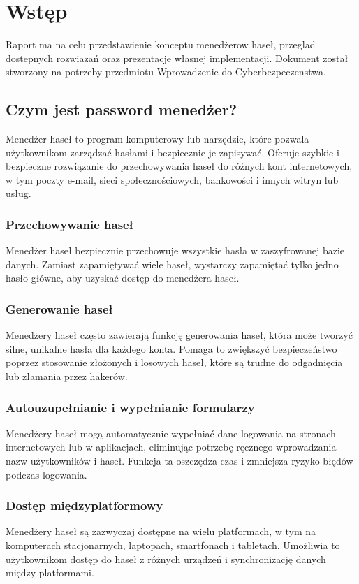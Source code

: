 \section{Wstęp}
Raport ma na celu przedstawienie konceptu menedżerow haseł, przeglad dostepnych rozwiazań oraz prezentacje własnej implementacji. Dokument został stworzony na potrzeby przedmiotu Wprowadzenie do Cyberbezpeczenstwa. 

\subsection{Czym jest password menedżer?}
Menedżer haseł to program komputerowy lub narzędzie, które pozwala użytkownikom zarządzać hasłami i bezpiecznie je zapisywać. Oferuje szybkie i bezpieczne rozwiązanie do przechowywania haseł do różnych kont internetowych, w tym poczty e-mail, sieci społecznościowych, bankowości i innych witryn lub usług.
\subsubsection{Przechowywanie haseł}
Menedżer haseł bezpiecznie przechowuje wszystkie hasła w zaszyfrowanej bazie danych. Zamiast zapamiętywać wiele haseł, wystarczy zapamiętać tylko jedno hasło główne, aby uzyskać dostęp do menedżera haseł.
\subsubsection{Generowanie haseł}
Menedżery haseł często zawierają funkcję generowania haseł, która może tworzyć silne, unikalne hasła dla każdego konta. Pomaga to zwiększyć bezpieczeństwo poprzez stosowanie złożonych i losowych haseł, które są trudne do odgadnięcia lub złamania przez hakerów.
\subsubsection{Autouzupełnianie i wypełnianie formularzy}
Menedżery haseł mogą automatycznie wypełniać dane logowania na stronach internetowych lub w aplikacjach, eliminując potrzebę ręcznego wprowadzania nazw użytkowników i haseł. Funkcja ta oszczędza czas i zmniejsza ryzyko błędów podczas logowania.
\subsubsection{Dostęp międzyplatformowy}
Menedżery haseł są zazwyczaj dostępne na wielu platformach, w tym na komputerach stacjonarnych, laptopach, smartfonach i tabletach. Umożliwia to użytkownikom dostęp do haseł z różnych urządzeń i synchronizację danych między platformami.

